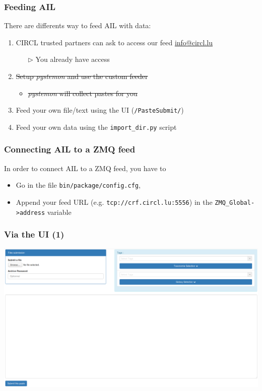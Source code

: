 \begin{frame}
\frametitle{Feeding AIL}
    There are differents way to feed AIL with data:
    \begin{enumerate}
        \item CIRCL trusted partners can ask to access our feed {\tiny \href{mailto:info@circl.lu}{info@circl.lu}}
            \begin{itemize}
                \item[$\rhd$] You already have access
            \end{itemize}
        \item \st{Setup \textit{pystemon} and use the custom feeder}
            \begin{itemize}
                \item \st{\textit{pystemon} will collect pastes for you}
            \end{itemize}
        \item Feed your own file/text using the UI (\texttt{/PasteSubmit/})
        \item Feed your own data using the \texttt{import\_dir.py} script
    \end{enumerate}
\end{frame}


\begin{frame}
    \frametitle{Connecting AIL to a ZMQ feed}
        In order to connect AIL to a ZMQ feed, you have to
        \begin{itemize}
            \item Go in the file \texttt{\large{bin/package/config.cfg}},
            \item Append your feed URL (e.g. \texttt{tcp://crf.circl.lu:5556}) in the \texttt{ZMQ\_Global->address} variable
        \end{itemize}
\end{frame}

\begin{frame}
    \frametitle{Via the UI (1)}
    \centerline{\includegraphics[scale=0.20]{screenshot/paste_submit.png}}
\end{frame}

